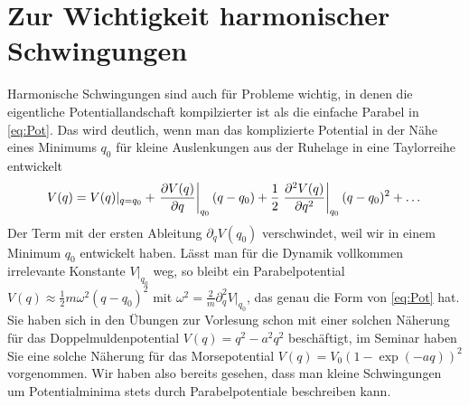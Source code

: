 \documentclass[paper=a4, fontsize=11.0pt, abstractoff, DIV12]{scrartcl}
\begin{document}
\section{Zur Wichtigkeit harmonischer Schwingungen}

Harmonische Schwingungen sind auch für Probleme wichtig, in denen die
eigentliche Potentiallandschaft kompilzierter ist als die einfache Parabel
in \eqref{eq:Pot}. Das wird deutlich, wenn man das komplizierte Potential in
der Nähe eines Minimums $q_0$ für kleine Auslenkungen aus der Ruhelage in
eine Taylorreihe entwickelt
\begin{equation}
V(q) = V(q)\vert_{q=q_0}+ \left.\frac{\partial V(q)}{\partial q}\right|_{q_0}(q - q_0)  + \frac{1}{2}\left. \frac{\partial^2 V(q)}{\partial {q}^2} \right|_{q_0}(q - q_0)^2 + \dots
\end{equation}
Der Term mit der ersten Ableitung $\partial_q V(q_0)$ verschwindet, weil wir
in einem Minimum $q_0$ entwickelt haben. Lässt man für die Dynamik vollkommen
irrelevante Konstante $V|_{q_0}$ weg, so bleibt ein Parabelpotential
$V(q) \approx \frac{1}{2}m\omega^2 (q-q_0)^2$ mit
$\omega^2 = \frac{2}{m}\partial_q^2 V|_{q_0} $, das genau die Form von
\eqref{eq:Pot} hat. Sie haben sich in den Übungen zur Vorlesung schon mit
einer solchen Näherung für das Doppelmuldenpotential $V(q) = q^2-a^2q^2$ beschäftigt, im
Seminar haben Sie eine solche Näherung für das Morsepotential $V(q) = V_0\left(1-\exp(-aq)\right)^2$
vorgenommen. Wir haben also bereits gesehen, dass man kleine Schwingungen um
Potentialminima stets durch Parabelpotentiale beschreiben kann.
\end{document}
